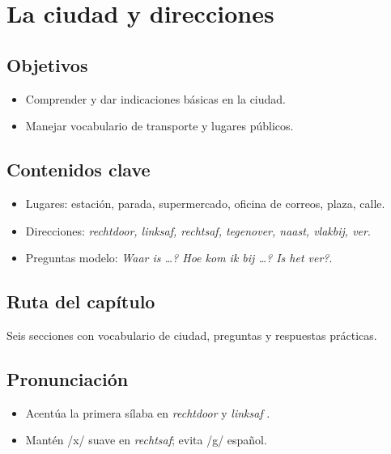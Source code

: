 \chapter{La ciudad y direcciones}
\section{Objetivos}
\begin{itemize}[leftmargin=*]
	\item Comprender y dar indicaciones básicas en la ciudad.
	\item Manejar vocabulario de transporte y lugares públicos.
\end{itemize}

\section{Contenidos clave}
\begin{itemize}[leftmargin=*]
	\item Lugares: estación, parada, supermercado, oficina de correos, plaza, calle.
	\item Direcciones: \textit{rechtdoor, linksaf, rechtsaf, tegenover, naast, vlakbij, ver}.
	\item Preguntas modelo: \textit{Waar is \ldots{}? Hoe kom ik bij \ldots{}? Is het ver?}.
\end{itemize}

\section{Ruta del capítulo}
Seis secciones con vocabulario de ciudad, preguntas y respuestas prácticas.








\section{Pronunciación}
\begin{itemize}[leftmargin=*]
	\item Acentúa la primera sílaba en \textit{rechtdoor}  y \textit{linksaf} .
	\item Mantén /x/ suave en \textit{rechtsaf}; evita /g/ español.
\end{itemize}

